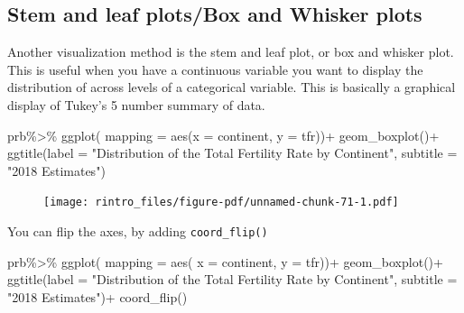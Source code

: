 \documentclass[
  letterpaper,
  DIV=11,
  numbers=noendperiod]{scrreprt}
\newenvironment{Shaded}{\begin{snugshade}}{\end{snugshade}}
\newcommand{\AttributeTok}[1]{\textcolor[rgb]{0.40,0.45,0.13}{#1}}
\newcommand{\FunctionTok}[1]{\textcolor[rgb]{0.28,0.35,0.67}{#1}}
\newcommand{\NormalTok}[1]{\textcolor[rgb]{0.00,0.23,0.31}{#1}}
\newcommand{\SpecialCharTok}[1]{\textcolor[rgb]{0.37,0.37,0.37}{#1}}
\newcommand{\StringTok}[1]{\textcolor[rgb]{0.13,0.47,0.30}{#1}}
\begin{document}
\hypertarget{stem-and-leaf-plotsbox-and-whisker-plots}{%
\subsection{Stem and leaf plots/Box and Whisker
plots}\label{stem-and-leaf-plotsbox-and-whisker-plots}}

Another visualization method is the stem and leaf plot, or box and
whisker plot. This is useful when you have a continuous variable you
want to display the distribution of across levels of a categorical
variable. This is basically a graphical display of Tukey's 5 number
summary of data.

\begin{Shaded}
\begin{Highlighting}[]
\NormalTok{prb}\SpecialCharTok{\%\textgreater{}\%}
  \FunctionTok{ggplot}\NormalTok{( }\AttributeTok{mapping =} \FunctionTok{aes}\NormalTok{(}\AttributeTok{x =}\NormalTok{ continent, }\AttributeTok{y =}\NormalTok{ tfr))}\SpecialCharTok{+}
  \FunctionTok{geom\_boxplot}\NormalTok{()}\SpecialCharTok{+}
  \FunctionTok{ggtitle}\NormalTok{(}\AttributeTok{label =} \StringTok{"Distribution of the Total Fertility Rate by Continent"}\NormalTok{,}
          \AttributeTok{subtitle =} \StringTok{"2018 Estimates"}\NormalTok{)}
\end{Highlighting}
\end{Shaded}

\begin{figure}[H]

{\centering \texttt{[image: rintro\_files/figure-pdf/unnamed-chunk-71-1.pdf]}

}

\end{figure}

You can flip the axes, by adding \texttt{coord\_flip()}

\begin{Shaded}
\begin{Highlighting}[]
\NormalTok{prb}\SpecialCharTok{\%\textgreater{}\%}
\FunctionTok{ggplot}\NormalTok{( }\AttributeTok{mapping =} \FunctionTok{aes}\NormalTok{( }\AttributeTok{x =}\NormalTok{ continent,}
                       \AttributeTok{y =}\NormalTok{ tfr))}\SpecialCharTok{+}
  \FunctionTok{geom\_boxplot}\NormalTok{()}\SpecialCharTok{+}
  \FunctionTok{ggtitle}\NormalTok{(}\AttributeTok{label =} \StringTok{"Distribution of the Total Fertility Rate by Continent"}\NormalTok{,}
          \AttributeTok{subtitle =} \StringTok{"2018 Estimates"}\NormalTok{)}\SpecialCharTok{+}
  \FunctionTok{coord\_flip}\NormalTok{()}
\end{Highlighting}
\end{Shaded}
\end{document}
